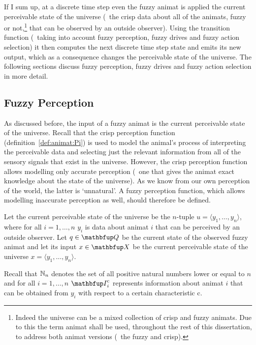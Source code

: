 If I sum up, at a discrete time step even the fuzzy animat is applied the current perceivable state of the universe (\ie\ the crisp data about all of the animats, fuzzy or not,\footnote{Indeed the universe can be a mixed collection of crisp and fuzzy animats. Due to this the term animat shall be used, throughout the rest of this dissertation, to address both animat versions (\ie\ the fuzzy and crisp).} that can be observed by an outside observer). Using the transition function (\ie\ taking into account fuzzy perception, fuzzy drives and fuzzy action selection) it then computes the next discrete time step state and emits its new output, which as a consequence changes the perceivable state of the universe. The following sections discuss fuzzy perception, fuzzy drives and fuzzy action selection in more detail.

\subsection{Fuzzy Perception}
As discussed before, the input of a fuzzy animat is the current perceivable state of the universe. Recall that the crisp perception function (definition~\ref{def:animat:Pi}) is used to model the animal's process of interpreting the perceivable data and selecting just the relevant information from all of the sensory signals that exist in the universe. However, the crisp perception function allows modelling only accurate perception (\ie\ one that gives the animat exact knowledge about the state of the universe). As we know from our own perception of the world, the latter is `unnatural'. A fuzzy perception function, which allows modelling inaccurate perception as well, should therefore be defined.

Let the current perceivable state of the universe be the $n$-tuple $u=\langle y_1,\ldots,y_n \rangle$, where for all $i=1,\ldots,n$ $y_i$ is data about animat $i$ that can be perceived by an outside observer. Let $q \in \set{Q}$ be the current state of the observed fuzzy animat and let its input $x \in \set{X}$ be the current perceivable state of the universe $x=\langle y_1,\ldots,y_n \rangle$. 

Recall that $\mathbb{N}_n$ denotes the set of all positive natural numbers lower or equal to $n$ and for all $i=1,\ldots,n$ $\set{I}^\textnormal{c}_i$ represents information about animat $i$ that can be obtained from $y_i$ with respect to a certain characteristic $\mathrm{c}$.

